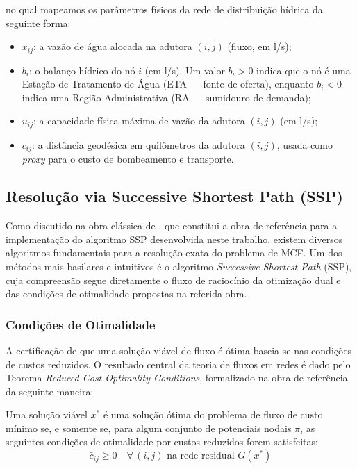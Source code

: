 \noindent no qual mapeamos os parâmetros físicos da rede de distribuição hídrica da seguinte forma:
\begin{itemize}
  \item $x_{ij}$: a vazão de água alocada na adutora $(i,j)$ (fluxo, em l/s);
  \item $b_i$: o balanço hídrico do nó $i$ (em l/s). Um valor $b_i > 0$ indica que o nó é uma Estação de Tratamento de Água (ETA --- fonte de oferta), enquanto $b_i < 0$ indica uma Região Administrativa (RA --- sumidouro de demanda);
  \item $u_{ij}$: a capacidade física máxima de vazão da adutora $(i,j)$ (em l/s);
  \item $c_{ij}$: a distância geodésica em quilômetros da adutora $(i,j)$, usada como \textit{proxy} para o custo de bombeamento e transporte.
\end{itemize}

\subsection{Resolução via Successive Shortest Path (SSP)}

Como discutido na obra clássica de \textcite{ahuja1993network}, que constitui a obra de referência para a implementação do algoritmo SSP desenvolvida neste trabalho, existem diversos algoritmos fundamentais para a resolução exata do problema de MCF. Um dos métodos mais basilares e intuitivos é o algoritmo \textit{Successive Shortest Path} (SSP), cuja compreensão segue diretamente o fluxo de raciocínio da otimização dual e das condições de otimalidade propostas na referida obra.

\subsubsection{Condições de Otimalidade}

A certificação de que uma solução viável de fluxo é ótima baseia-se nas condições de custos reduzidos. O resultado central da teoria de fluxos em redes é dado pelo Teorema \textit{Reduced Cost Optimality Conditions}, formalizado na obra de referência da seguinte maneira:

\begin{theorem}
Uma solução viável $x^*$ é uma solução ótima do problema de fluxo de custo mínimo se, e somente se, para algum conjunto de potenciais nodais $\pi$, as seguintes condições de otimalidade por custos reduzidos forem satisfeitas:
\begin{equation}
  \bar{c}_{ij} \geq 0 \quad \forall \, (i,j) \text{ na rede residual } G(x^*)
\end{equation}
\end{theorem}

